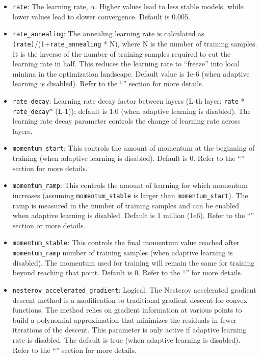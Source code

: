 \begin{itemize}
\item \texttt{rate}: The learning rate, $\alpha$. Higher values lead to less stable models, while lower values lead to slower convergence. Default is 0.005.  %

\item \texttt{rate\_annealing}: The annealing learning rate is calculated as \texttt{(rate)}/(1+\texttt{rate\_annealing} * N), where N is the number of training samples.  It is the inverse of the number of training samples required to cut the learning rate in half.  This reduces the learning rate to ``freeze'' into local minima in the optimization landscape.  Default value is 1e-6 (when adaptive learning is disabled). Refer to the ``'' section for more details.

\item \texttt{rate\_decay}: Learning rate decay factor between layers (L-th layer: \texttt{rate} * \texttt{rate\_decay\^} (L-1)); default is 1.0 (when adaptive learning is disabled). The learning rate decay parameter controls the change of learning rate across layers.

\item \texttt{momentum\_start}: This controls the amount of momentum at the beginning of training (when adaptive learning is disabled). Default is 0. Refer to the ``'' section for more details.

\item \texttt{momentum\_ramp}: This controls the amount of learning for which momentum increases (assuming \texttt{momentum\_stable} is larger than \texttt{momentum\_start}).  The ramp is measured in the number of training samples and can be enabled when adaptive learning is disabled. Default is 1 million (1e6). Refer to the  ``'' section or more details.

\item \texttt{momentum\_stable}: This controls the final momentum value reached after \texttt{momentum\_ramp} number of training samples (when adaptive learning is disabled). The momentum used for training will remain the same for training beyond reaching that point. Default is 0.  Refer to the ``'' for more details.

\item \texttt{nesterov\_accelerated\_gradient}:  Logical.  The Nesterov accelerated gradient descent method is a modification to traditional gradient descent for convex functions. The method relies on gradient information at various points to build a polynomial approximation that minimizes the residuals in fewer iterations of the descent. This parameter is only active if adaptive learning rate is disabled.  The default is true (when adaptive learning is disabled). Refer to the ``'' section for more details.


\end{itemize}
